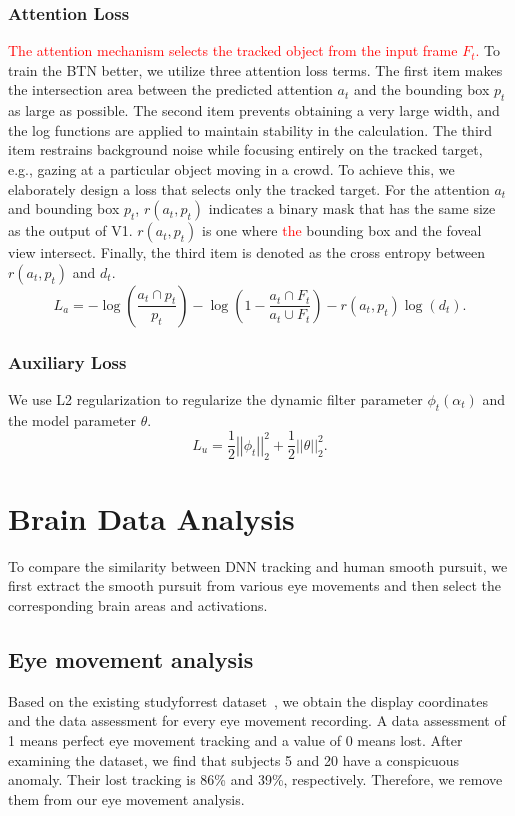 \documentclass[final,3p,times,twocolumn]{elsarticle}
\begin{document}
\subsubsection{Attention Loss}
\textcolor{red}{
The attention mechanism selects the tracked object from the input frame $F_t$.}
To train the BTN better, we utilize three attention loss terms.
The first item makes the intersection area between the predicted attention $a_t$ and the bounding box $p_t$ as large as possible. 
The second item prevents obtaining a very large width, and the log functions are applied to maintain stability in the calculation. 
The third item restrains background noise while focusing entirely on the tracked target, e.g., gazing at a particular object moving in a crowd. 
To achieve this, we elaborately design a loss that selects only the tracked target.
For the attention $a_t$ and bounding box $p_t$, $r(a_t, p_t)$ indicates a binary mask that has the same size as the output of V1. 
$r(a_t, p_t)$ is one where \textcolor{red}{the} bounding box and the foveal view intersect.
Finally, the third item is denoted as the cross entropy between $r(a_t, p_t)$ and $d_t$.
\begin{equation}
L_a = -\log (\frac{a_t \cap p_t}{p_t}) - \log (1 - \frac{a_t \cap F_t}{a_t \cup F_t})
- r(a_t, p_t) \log(d_t).
\end{equation}

\subsubsection{Auxiliary Loss}
We use L2 regularization to regularize the dynamic filter parameter $\phi_t(\alpha_t)$ and the model parameter $\theta$.
\begin{equation}
L_u = \frac{1}{2} \left\vert \left\vert \phi_t \right\vert \right\vert _2 ^2 
+ \frac{1}{2} \left\vert \left\vert \theta \right\vert \right\vert _2 ^2.
\end{equation}


\section{Brain Data Analysis}
To compare the similarity between DNN tracking and human smooth pursuit, we first extract the smooth pursuit from various eye movements 
and then select the corresponding brain areas and activations. 


\subsection{Eye movement analysis}
Based on the existing studyforrest dataset~\cite{gaze_forrest}, we obtain the display coordinates and the data assessment for every eye movement recording. 
A data assessment of 1 means perfect eye movement tracking 
and a value of 0 means lost. 
After examining the dataset, we find that subjects 5 and 20 have a conspicuous anomaly. 
Their lost tracking is 86\% and 39\%, respectively. 
Therefore, we remove them from our eye movement analysis. 
\end{document}
